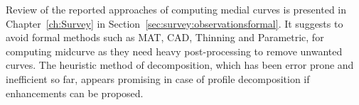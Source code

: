 Review of the reported approaches of computing medial curves is presented in Chapter~\ref{ch:Survey} in Section~\ref{sec:survey:observationsformal}. 
It suggests to avoid formal methods such as MAT, CAD, Thinning and Parametric, for computing midcurve as they need heavy post-processing to remove unwanted curves. The heuristic method of decomposition, which has been error prone and inefficient so far, appears promising in case of profile decomposition if enhancements can be proposed.


